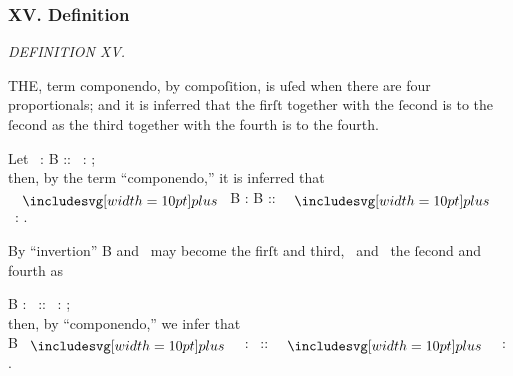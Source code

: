 \documentclass[12pt,preview]{standalone}
\begin{document}
\subsubsection{XV. Definition}

\begin{minipage}{\textwidth}

    \begin{center}
        \textit{DEFINITION XV.}\label{book5def15} \\
    \end{center}

    \hfill

    \newcommand{\redA}{{\color{cred}{A}}}
    \newcommand{\yellowC}{{\color{cyellow}{C}}}
    \newcommand{\blueD}{{\color{cblue}{D}}}

    \raggedright T\textsc{HE}, term componendo, by compoſition, is uſed when there are four proportionals; and it is inferred that the firſt together with the ſecond is to the ſecond as the third together with the fourth is to the fourth.\\

    \hfill

    \begin{center}
        Let \redA\ : B :: \yellowC\ : \blueD;\\
        then, by the term “componendo,” it is inferred that\\
        \redA\ $\bplus$ B : B :: \yellowC\ $\bplus$ \blueD\ : \blueD.
    \end{center}

    \hfill

    By “invertion” B and \blueD\ may become the firſt and third, \redA\ and \yellowC\ the ſecond and fourth as\\

    \begin{center}
        B : \redA\ :: \blueD\ : \yellowC;\\
        then, by “componendo,” we infer that\\
        B $\bplus$ \redA\ : \redA\ :: \blueD\ $\bplus$ \yellowC\ : \yellowC.
    \end{center}

    \hfill

\end{minipage}
\end{document}
